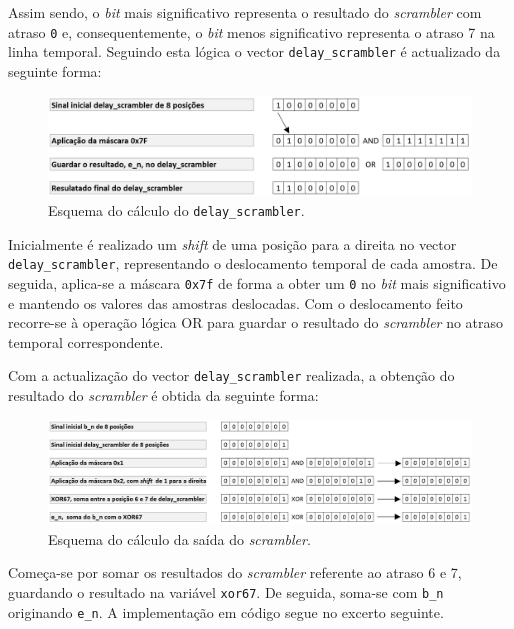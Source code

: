 \documentclass[11pt]{article}
\numberwithin{equation}{section}
\begin{document}
Assim sendo, o \textit{bit} mais significativo representa o resultado do \textit{scrambler} com atraso \texttt{0} e, consequentemente, o \textit{bit} menos significativo representa o atraso 7 na linha temporal. Seguindo esta lógica o vector \texttt{delay\_scrambler} é actualizado da seguinte forma:

\begin{figure}[H]
	\centering
	\includegraphics[keepaspectratio=true, scale=0.40]{teoricas/calculodoscrambler}
	\caption{Esquema do cálculo do \texttt{delay\_scrambler}.}
	\vspace{-0.8em}
\end{figure}

Inicialmente é realizado um \textit{shift} de uma posição para a direita no vector \texttt{delay\_scrambler}, representando o deslocamento temporal de cada amostra. De seguida, aplica-se a máscara \texttt{0x7f} de forma a obter um \texttt{0} no \textit{bit} mais significativo e mantendo os valores das amostras deslocadas. Com o deslocamento feito recorre-se à operação lógica OR para guardar o resultado do \textit{scrambler} no atraso temporal correspondente.

Com a actualização do vector \texttt{delay\_scrambler} realizada, a obtenção do resultado do \textit{scrambler} é obtida da seguinte forma:  

\begin{figure}[H]
	\centering
	\includegraphics[keepaspectratio=true, scale=0.40]{teoricas/calculodeen}
	\caption{Esquema do cálculo da saída do \textit{scrambler}.}
	\vspace{-0.8em}
\end{figure}

Começa-se por somar os resultados do \textit{scrambler} referente ao atraso 6 e 7, guardando o resultado na variável \texttt{xor67}. De seguida, soma-se com \texttt{b\_n} originando \texttt{e\_n}. A implementação em código segue no excerto seguinte.
\end{document}
